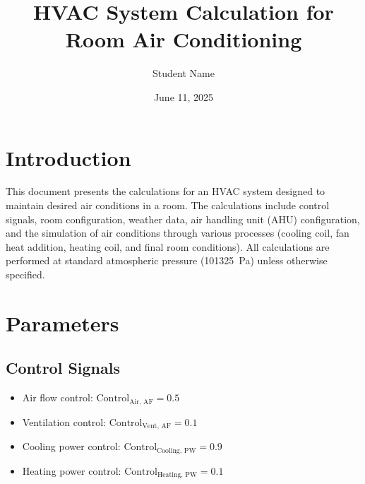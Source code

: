 \documentclass[12pt]{article}
\title{HVAC System Calculation for Room Air Conditioning}
\author{Student Name}
\date{June 11, 2025}
\begin{document}
\maketitle

\section{Introduction}
This document presents the calculations for an HVAC system designed to maintain desired air conditions in a room. The calculations include control signals, room configuration, weather data, air handling unit (AHU) configuration, and the simulation of air conditions through various processes (cooling coil, fan heat addition, heating coil, and final room conditions). All calculations are performed at standard atmospheric pressure (\SI{101325}{\pascal}) unless otherwise specified.

\section{Parameters}

\subsection{Control Signals}
\begin{itemize}
    \item Air flow control: \( \text{Control}_{\text{Air, AF}} = 0.5 \)
    \item Ventilation control: \( \text{Control}_{\text{Vent, AF}} = 0.1 \)
    \item Cooling power control: \( \text{Control}_{\text{Cooling, PW}} = 0.9 \)
    \item Heating power control: \( \text{Control}_{\text{Heating, PW}} = 0.1 \)
\end{itemize}
\end{document}
